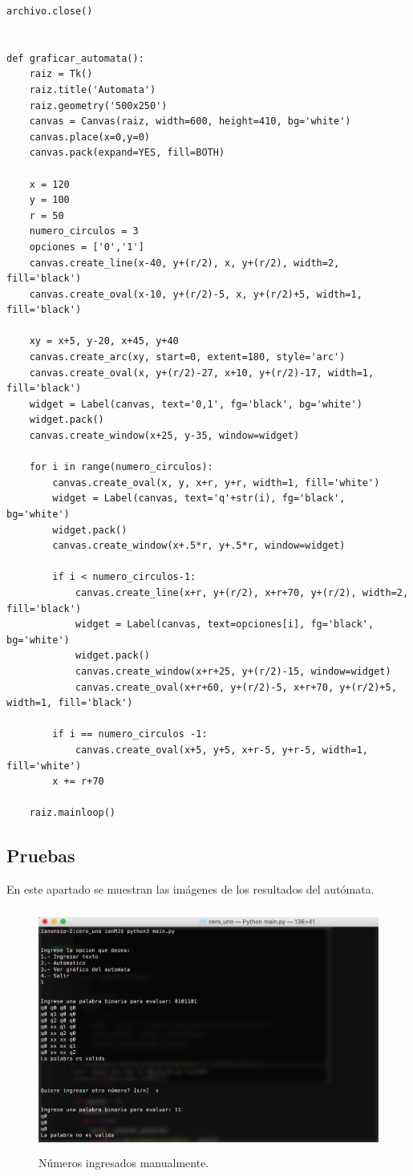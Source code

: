 \documentclass[12pt]{article}
\begin{document}
\begin{lstlisting}[frame=single]
    archivo.close()


def graficar_automata():
    raiz = Tk()
    raiz.title('Automata')
    raiz.geometry('500x250')
    canvas = Canvas(raiz, width=600, height=410, bg='white')
    canvas.place(x=0,y=0)
    canvas.pack(expand=YES, fill=BOTH)

    x = 120
    y = 100
    r = 50
    numero_circulos = 3
    opciones = ['0','1']
    canvas.create_line(x-40, y+(r/2), x, y+(r/2), width=2, fill='black')
    canvas.create_oval(x-10, y+(r/2)-5, x, y+(r/2)+5, width=1, fill='black')

    xy = x+5, y-20, x+45, y+40
    canvas.create_arc(xy, start=0, extent=180, style='arc')
    canvas.create_oval(x, y+(r/2)-27, x+10, y+(r/2)-17, width=1, fill='black')
    widget = Label(canvas, text='0,1', fg='black', bg='white')
    widget.pack()
    canvas.create_window(x+25, y-35, window=widget)

    for i in range(numero_circulos):
        canvas.create_oval(x, y, x+r, y+r, width=1, fill='white')
        widget = Label(canvas, text='q'+str(i), fg='black', bg='white')
        widget.pack()
        canvas.create_window(x+.5*r, y+.5*r, window=widget)

        if i < numero_circulos-1:
            canvas.create_line(x+r, y+(r/2), x+r+70, y+(r/2), width=2, fill='black')
            widget = Label(canvas, text=opciones[i], fg='black', bg='white')
            widget.pack()
            canvas.create_window(x+r+25, y+(r/2)-15, window=widget)
            canvas.create_oval(x+r+60, y+(r/2)-5, x+r+70, y+(r/2)+5, width=1, fill='black')

        if i == numero_circulos -1:
            canvas.create_oval(x+5, y+5, x+r-5, y+r-5, width=1, fill='white')
        x += r+70

    raiz.mainloop()

\end{lstlisting}

\newpage
\subsection{Pruebas}
En este apartado se muestran las imágenes de los resultados del autómata.

\begin{figure}[H]
\includegraphics[width=\textwidth, height=8cm]{cero_uno_manual}
\caption{Números ingresados manualmente.}
\label{fig:automata_cero_uno_texto}
\end{figure}
\end{document}
